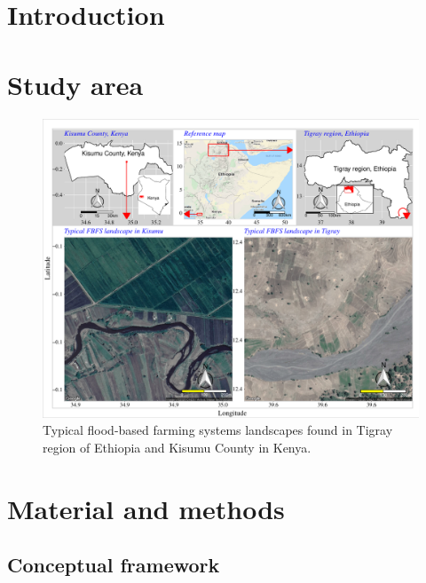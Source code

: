 \documentclass[]{elsarticle} %
\begin{document}
\hypertarget{introduction}{%
\section*{Introduction}\label{introduction}}

\hypertarget{section_1}{%
\section{Study area}\label{section_1}}

\begin{figure}[!h]

{\centering \includegraphics[width=1\linewidth,]{figures/study_area_map} 

}

\caption{Typical flood-based farming systems landscapes found in Tigray region of Ethiopia and Kisumu County in Kenya.}\label{fig:fig1}
\end{figure}

\hypertarget{section_2}{%
\section{Material and methods}\label{section_2}}

\hypertarget{section_2_1}{%
\subsection{Conceptual framework}\label{section_2_1}}
\end{document}
